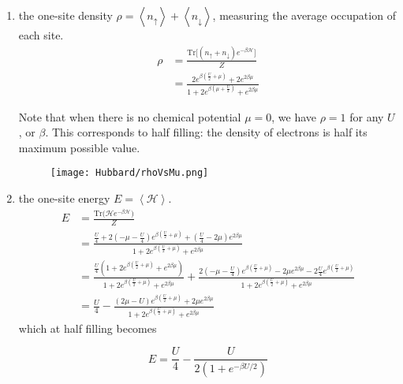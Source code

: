 \begin{enumerate}
\item the one-site density $\rho = \left\langle n_\uparrow \right\rangle + \left\langle n_\downarrow \right\rangle$, measuring the average occupation of each site.
\begin{equation}
\begin{split}
\rho &= \frac{\text{Tr} \big[ (n_\uparrow + n_\downarrow ) e^{-\beta\mathcal{H}} \big]}{Z} \\
&= \frac{2 e^{\beta(\frac{U}{2} + \mu)} + 2 e^{2\beta\mu}}{1 + 2 e^{\beta(\mu + \frac{U}{2})} + e^{2 \beta \mu}}
\end{split}
\end{equation}

Note that when there is no chemical potential $\mu = 0$, we have $\rho = 1$ for any $U$, or $\beta$.
This corresponds to half filling: the density of electrons is half its maximum possible value.

\begin{figure}[H]
	\centering
\hspace{12mm}\texttt{[image: Hubbard/rhoVsMu.png]}
	\caption[]{}
	\label{fig:rhoVsMu}
\end{figure}

\item the one-site energy $E = \left\langle \mathcal{H} \right\rangle$.
\begin{equation}
\begin{split}
E &= \frac{\text{Tr}\bigg( \mathcal{H}e^{-\beta\mathcal{H} } \bigg)}{Z} \\
&= \frac{ \frac{U}{4} + 2 ( -\mu - \frac{U}{4} ) e^{\beta(\frac{U}{2} + \mu )} + (\frac{U}{4} - 2\mu ) e^{2\beta\mu}}{1 + 2 e^{\beta (\frac{U}{2} + \mu )} + e^{2\beta\mu} } \\
&= \frac{ \frac{U}{4} ( 1 + 2 e^{\beta (\frac{U}{2} + \mu )} + e^{2\beta\mu} )}{1 + 2 e^{\beta (\frac{U}{2} + \mu )} + e^{2\beta\mu} } + \frac{2(-\mu - \frac{U}{4}) e^{\beta(\frac{U}{2} + \mu)} - 2\mu e^{2\beta\mu} - 2\frac{U}{4} e^{\beta (\frac{U}{2} + \mu)} }{1 + 2 e^{\beta (\frac{U}{2} + \mu )} + e^{2\beta\mu}} \\
&= \frac{U}{4} - \frac{ (2\mu - U) e^{\beta(\frac{U}{2} + \mu) } + 2\mu e^{2\beta\mu} }{1 + 2 e^{\beta (\frac{U}{2} + \mu )} + e^{2\beta\mu} }
\end{split}
\end{equation}
which at half filling becomes

\begin{equation}
E = \frac{U}{4} - \frac{U}{2 ( 1 + e^{-\beta U /2} )}
\end{equation}


\end{enumerate}
